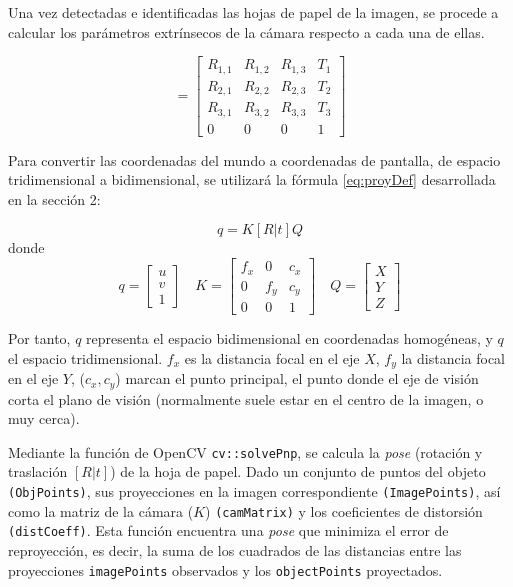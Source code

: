 
Una vez detectadas e identificadas las hojas de papel de la imagen, se procede a calcular los parámetros extrínsecos de la cámara respecto a cada una de ellas.

\begin{equation}
  [R|t] = \begin{bmatrix} R_{1,1} & R_{1,2} & R_{1,3} & T_{1}  \\
    R_{2,1} & R_{2,2} & R_{2,3} & T_{2}  \\
    R_{3,1} & R_{3,2} & R_{3,3} & T_{3}  \\
    0    &     0    &     0    &  1
  \end{bmatrix}
\end{equation}

Para convertir las coordenadas del mundo a coordenadas de pantalla, de espacio tridimensional a bidimensional, se utilizará la fórmula \ref{eq:proyDef} desarrollada en la sección 2:

\begin{equation}
  q=K[R|t]Q
\end{equation}
donde
\begin{equation}
  q=\begin{bmatrix} u \\ v \\ 1 \end{bmatrix} \quad K=\begin{bmatrix} f_{x} & 0 & c_{x} \\ 0 & f_{y} & c_{y} \\ 0 & 0 & 1 \end{bmatrix} \quad Q=\begin{bmatrix} X \\ Y \\ Z \end{bmatrix}
\end{equation}

Por tanto, $q$ representa el espacio bidimensional en coordenadas homogéneas, y $q$ el espacio
tridimensional. $f_{x}$ es la distancia focal en el eje $X$, $f_{y}$ la distancia focal en el eje
$Y$, ($c_{x},c_{y}$) marcan el punto principal, el punto donde el eje de visión corta el plano de
visión (normalmente suele estar en el centro de la imagen, o muy cerca).

Mediante la función de OpenCV \texttt{cv::solvePnp}, se calcula la \emph{pose} (rotación y
traslación $[R|t]$) de la hoja de papel. Dado un conjunto de puntos del objeto \texttt{(ObjPoints)}, sus proyecciones en la imagen correspondiente \texttt{(ImagePoints)}, así como la matriz de la cámara ($K$) \texttt{(camMatrix)} y los coeficientes de distorsión \texttt{(distCoeff)}. Esta función encuentra una \emph{pose} que minimiza el error de reproyección, es decir, la suma de los cuadrados de las distancias entre las proyecciones \texttt{imagePoints} observados y los \texttt{objectPoints} proyectados.

